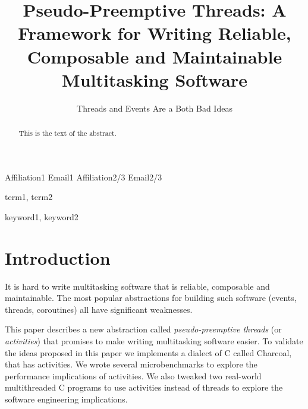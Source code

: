 \documentclass[10pt,preprint]{sigplanconf}
\begin{document}
\newcommand{\charcoal}{Charcoal}

\setlength{\pdfpageheight}{\paperheight}
\setlength{\pdfpagewidth}{\paperwidth}



\title{Pseudo-Preemptive Threads: A Framework for Writing Reliable, Composable and Maintainable Multitasking Software}
\subtitle{Threads and Events Are a Both Bad Ideas}

           {Affiliation1}
           {Email1}
           {Affiliation2/3}
           {Email2/3}

\maketitle

\begin{abstract}
This is the text of the abstract.
\end{abstract}


\terms
term1, term2

\keywords
keyword1, keyword2

\section{Introduction}

It is hard to write multitasking software that is reliable, composable and maintainable.
The most popular abstractions for building such software (events, threads, coroutines) all have significant weaknesses.

This paper describes a new abstraction called \emph{pseudo-preemptive threads} (or \emph{activities}) that promises to make writing multitasking software easier.
To validate the ideas proposed in this paper we implements a dialect of C called \charcoal, that has activities.
We wrote several microbenchmarks to explore the performance implications of activities.
We also tweaked two real-world multithreaded C programs to use activities instead of threads to explore the software engineering implications.
\end{document}
